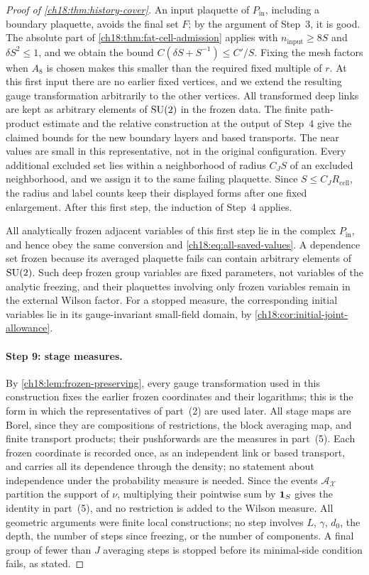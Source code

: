 \begin{proof}[Proof of \cref{ch18:thm:history-cover}]
An input plaquette of $P_{\mathrm{in}}$, including a boundary plaquette, avoids the final set $F$; by the argument of Step~3, it is good. The absolute part of \cref{ch18:thm:fat-cell-admission} applies with $n_{\mathrm{input}}\ge8S$ and $\delta S^2\le1$, and we obtain the bound $C(\delta S+S^{-1})\le C'/S$. Fixing the mesh factors when $A_8$ is chosen makes this smaller than the required fixed multiple of $r$. At this first input there are no earlier fixed vertices, and we extend the resulting gauge transformation arbitrarily to the other vertices. All transformed deep links are kept as arbitrary elements of $\mathrm{SU}(2)$ in the frozen data. The finite path-product estimate and the relative construction at the output of Step~4 give the claimed bounds for the new boundary layers and based transports. The near values are small in this representative, not in the original configuration. Every additional excluded set lies within a neighborhood of radius $C_JS$ of an excluded neighborhood, and we assign it to the same failing plaquette. Since $S\le C_JR_{\mathrm{cell}}$, the radius and label counts keep their displayed forms after one fixed enlargement. After this first step, the induction of Step~4 applies.

All analytically frozen adjacent variables of this first step lie in the complex $P_{\mathrm{in}}$, and hence obey the same conversion and \eqref{ch18:eq:all-saved-values}. A dependence set frozen because its averaged plaquette fails can contain arbitrary elements of $\mathrm{SU}(2)$. Such deep frozen group variables are fixed parameters, not variables of the analytic freezing, and their plaquettes involving only frozen variables remain in the external Wilson factor. For a stopped measure, the corresponding initial variables lie in its gauge-invariant small-field domain, by \cref{ch18:cor:initial-joint-allowance}.

\paragraph{Step 9: stage measures.}
By \cref{ch18:lem:frozen-preserving}, every gauge transformation used in this construction fixes the earlier frozen coordinates and their logarithms; this is the form in which the representatives of part~(2) are used later. All stage maps are Borel, since they are compositions of restrictions, the block averaging map, and finite transport products; their pushforwards are the measures in part~(5). Each frozen coordinate is recorded once, as an independent link or based transport, and carries all its dependence through the density; no statement about independence under the probability measure is needed. Since the events $\mathcal A_{\mathcal X}$ partition the support of $\nu$, multiplying their pointwise sum by $\mathbf 1_S$ gives the identity in part~(5), and no restriction is added to the Wilson measure. All geometric arguments were finite local constructions; no step involves $L$, $\gamma$, $d_0$, the depth, the number of steps since freezing, or the number of components. A final group of fewer than $J$ averaging steps is stopped before its minimal-side condition fails, as stated.
\end{proof}

